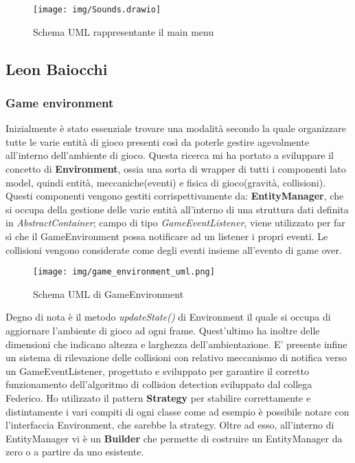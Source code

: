 \begin{figure}[H]
	\centering{}
	\texttt{[image: img/Sounds.drawio]}
	\label{img:Sounds.drawio.png}
	\caption{Schema UML rappresentante il main menu\\}
\end{figure}


\newpage

\subsection*{Leon Baiocchi}

\subsubsection{Game environment}
Inizialmente è stato essenziale trovare una modalità secondo la quale organizzare tutte le varie
entità di gioco presenti così da poterle gestire agevolmente all'interno dell'ambiente di gioco.
Questa ricerca mi ha portato a sviluppare il concetto di \textbf{Environment}, ossia una sorta di wrapper di tutti i componenti lato model, quindi entità, meccaniche(eventi) e fisica di gioco(gravità, collisioni).
Questi componenti vengono gestiti corrispettivamente da: \textbf{EntityManager}, che si occupa della gestione delle varie entità all'interno di una struttura dati definita in \textit{AbstractContainer}; campo di tipo \textit{GameEventListener}, viene utilizzato per far sì che il GameEnvironment possa notificare ad un listener i propri eventi.
Le collisioni vengono considerate come degli eventi insieme all'evento di game over.

\begin{figure}[H]
	\centering{}
	\texttt{[image: img/game\_environment\_uml.png]}
	\label{img:game_environment_uml.png}
	\caption{Schema UML di GameEnvironment\\}
\end{figure}

Degno di nota è il metodo \textit{updateState()} di Environment il quale si occupa di aggiornare l'ambiente di gioco ad ogni frame.
Quest'ultimo ha inoltre delle dimensioni che indicano altezza e larghezza dell'ambientazione.
E' presente infine un sistema di rilevazione delle collisioni con relativo meccanismo di notifica verso un GameEventListener, progettato e sviluppato per garantire il corretto funzionamento dell'algoritmo di collision detection sviluppato dal collega Federico.
Ho utilizzato il pattern \textbf{Strategy} per stabilire correttamente e distintamente i vari compiti di ogni classe come ad esempio è possibile notare con l'interfaccia Environment, che sarebbe la strategy.
Oltre ad esso, all'interno di EntityManager vi è un \textbf{Builder} che permette di costruire un EntityManager da zero o a partire da uno esistente.


